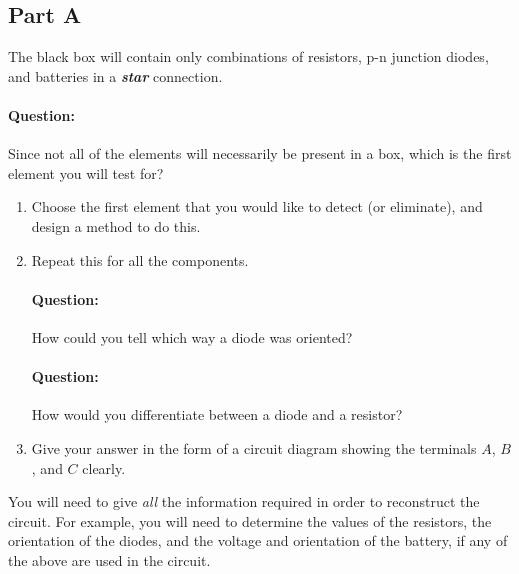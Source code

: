 \subsection*{Part A}

The black box will contain only combinations of resistors, p-n junction diodes, and batteries in a \textit{\textbf{star}} connection.

\begin{question}
    \paragraph{Question:} Since not all of the elements will necessarily be present in a box, which is the first element you will test for?
    \end{question}

\begin{enumerate}
    \item Choose the first element that you would like to detect (or eliminate), and design a method to do this.
    
    
    \item Repeat this for all the components.
    
    \begin{question}
    \paragraph{Question:} How could you tell which way a diode was oriented? 

    \paragraph{Question:} How would you differentiate between a diode and a resistor?
\end{question}
    
    \item Give your answer in the form of a circuit diagram showing the terminals $A$, $B$, and $C$ clearly. 
\end{enumerate}

\begin{tip}
You will need to give \textit{all} the information required in order to reconstruct the circuit. For example, you will need to determine the values of the resistors, the orientation of the diodes, and the voltage and orientation of the battery, if any of the above are used in the circuit.
\end{tip}


